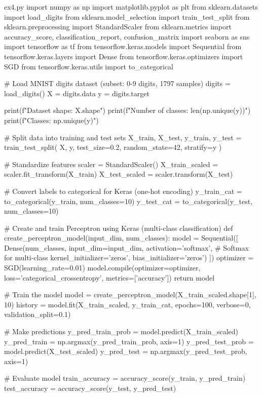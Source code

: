 \documentclass[12pt,a4paper]{article}
\begin{document}
\begin{codeholder}{ex4.py}
import numpy as np
import matplotlib.pyplot as plt
from sklearn.datasets import load_digits
from sklearn.model_selection import train_test_split
from sklearn.preprocessing import StandardScaler
from sklearn.metrics import accuracy_score, classification_report, confusion_matrix
import seaborn as sns
import tensorflow as tf
from tensorflow.keras.models import Sequential
from tensorflow.keras.layers import Dense
from tensorflow.keras.optimizers import SGD
from tensorflow.keras.utils import to_categorical

# Load MNIST digits dataset (subset: 0-9 digits, 1797 samples)
digits = load_digits()
X = digits.data
y = digits.target

print(f"Dataset shape:     {X.shape}")
print(f"Number of classes: {len(np.unique(y))}")
print(f"Classes:           {np.unique(y)}")

# Split data into training and test sets
X_train, X_test, y_train, y_test = train_test_split(
    X, y, test_size=0.2, random_state=42, stratify=y
)

# Standardize features
scaler = StandardScaler()
X_train_scaled = scaler.fit_transform(X_train)
X_test_scaled = scaler.transform(X_test)

# Convert labels to categorical for Keras (one-hot encoding)
y_train_cat = to_categorical(y_train, num_classes=10)
y_test_cat = to_categorical(y_test, num_classes=10)

# Create and train Perceptron using Keras (multi-class classification)
def create_perceptron_model(input_dim, num_classes):
    model = Sequential([
        Dense(num_classes, input_dim=input_dim, activation='softmax',  # Softmax for multi-class
              kernel_initializer='zeros', bias_initializer='zeros')
    ])
    optimizer = SGD(learning_rate=0.01)
    model.compile(optimizer=optimizer, loss='categorical_crossentropy', metrics=['accuracy'])
    return model

# Train the model
model = create_perceptron_model(X_train_scaled.shape[1], 10)
history = model.fit(X_train_scaled, y_train_cat, 
                    epochs=100, 
                    verbose=0,
                    validation_split=0.1)

# Make predictions
y_pred_train_prob = model.predict(X_train_scaled)
y_pred_train = np.argmax(y_pred_train_prob, axis=1)
y_pred_test_prob = model.predict(X_test_scaled)
y_pred_test = np.argmax(y_pred_test_prob, axis=1)

# Evaluate model
train_accuracy = accuracy_score(y_train, y_pred_train)
test_accuracy = accuracy_score(y_test, y_pred_test)


\end{codeholder}
\end{document}
